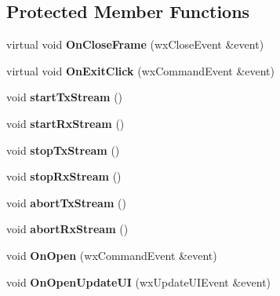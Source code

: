 \subsection*{Protected Member Functions}
\begin{DoxyCompactItemize}
\item 
\hypertarget{class_main_frame_ad96135c590b5739d8982b45a4778424e}{virtual void {\bfseries On\-Close\-Frame} (wx\-Close\-Event \&event)}\label{class_main_frame_ad96135c590b5739d8982b45a4778424e}

\item 
\hypertarget{class_main_frame_ab9ed8ca71402b68b41fd5a7cedb20928}{virtual void {\bfseries On\-Exit\-Click} (wx\-Command\-Event \&event)}\label{class_main_frame_ab9ed8ca71402b68b41fd5a7cedb20928}

\item 
\hypertarget{class_main_frame_af01eb2c59f1a9bcee0b956f8a72004c0}{void {\bfseries start\-Tx\-Stream} ()}\label{class_main_frame_af01eb2c59f1a9bcee0b956f8a72004c0}

\item 
\hypertarget{class_main_frame_ad17245c1c9c295fc216fc6615f31e0a5}{void {\bfseries start\-Rx\-Stream} ()}\label{class_main_frame_ad17245c1c9c295fc216fc6615f31e0a5}

\item 
\hypertarget{class_main_frame_a9c5b263953c6703f0e721ba5694391f4}{void {\bfseries stop\-Tx\-Stream} ()}\label{class_main_frame_a9c5b263953c6703f0e721ba5694391f4}

\item 
\hypertarget{class_main_frame_a91b813d6f6fc4c3777e332b018999a8d}{void {\bfseries stop\-Rx\-Stream} ()}\label{class_main_frame_a91b813d6f6fc4c3777e332b018999a8d}

\item 
\hypertarget{class_main_frame_abbe36f1aac14dba091ab0ec0c6ef2936}{void {\bfseries abort\-Tx\-Stream} ()}\label{class_main_frame_abbe36f1aac14dba091ab0ec0c6ef2936}

\item 
\hypertarget{class_main_frame_a44e48d93613d91be1db586553466feac}{void {\bfseries abort\-Rx\-Stream} ()}\label{class_main_frame_a44e48d93613d91be1db586553466feac}

\item 
\hypertarget{class_main_frame_aabe1bcb0b9f62cd0f7578456a05099ee}{void {\bfseries On\-Open} (wx\-Command\-Event \&event)}\label{class_main_frame_aabe1bcb0b9f62cd0f7578456a05099ee}

\item 
\hypertarget{class_main_frame_ad81168bd08750269977d4c1d7bd42477}{void {\bfseries On\-Open\-Update\-U\-I} (wx\-Update\-U\-I\-Event \&event)}\label{class_main_frame_ad81168bd08750269977d4c1d7bd42477}


\end{DoxyCompactItemize}
